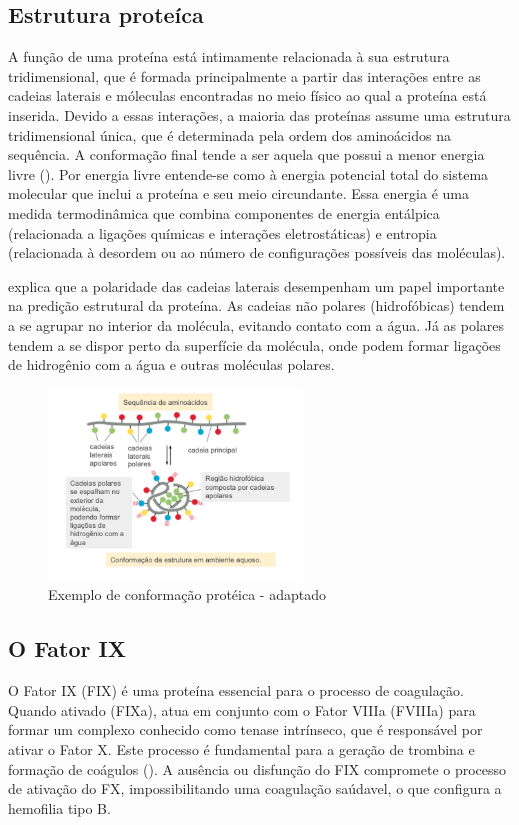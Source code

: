 \subsection{Estrutura proteíca}

A função de uma proteína está intimamente relacionada à sua estrutura tridimensional,
que é formada principalmente a partir das interações entre as cadeias laterais e móleculas encontradas no meio físico ao qual
a proteína está inserida. Devido a essas interações, a maioria das proteínas assume uma estrutura tridimensional única,
que é determinada pela ordem dos aminoácidos na sequência. 
A conformação final tende a ser aquela que possui a menor energia livre (\cite{Bio}).
Por energia livre entende-se como à energia potencial total do sistema molecular que inclui a proteína e seu meio circundante. 
Essa energia é uma medida termodinâmica que combina componentes de energia entálpica (relacionada a ligações químicas e interações eletrostáticas) 
e entropia (relacionada à desordem ou ao número de configurações possíveis das moléculas).

\cite{Bio} explica que a polaridade das cadeias laterais desempenham um papel importante na predição estrutural da proteína. 
As cadeias não polares (hidrofóbicas) tendem a se agrupar no interior da molécula, 
evitando contato com a água. 
Já as polares tendem a se dispor perto da superfície da molécula,
onde podem formar ligações de hidrogênio com a água e outras moléculas polares. 

\begin{figure}[H]
     \centering
     \includegraphics[width=0.6\textwidth]{figuras/ConformacaoProteica.png}
     \caption[Exemplo de conformação protéica]{Exemplo de conformação protéica \cite{Bio} - adaptado}
\end{figure}


\subsection{O Fator IX}
\label{subsection:FIX} 
O Fator IX (FIX) é uma proteína essencial para o processo de coagulação.
Quando ativado (FIXa), atua em conjunto com o Fator VIIIa (FVIIIa) para formar 
um complexo conhecido como tenase intrínseco, que é responsável por ativar o Fator X. 
Este processo é fundamental para a geração de trombina e formação de coágulos (\cite{FIX}). 
A ausência ou disfunção do FIX compromete o processo de ativação do FX,
impossibilitando uma coagulação saúdavel, o que configura a hemofilia tipo B.

